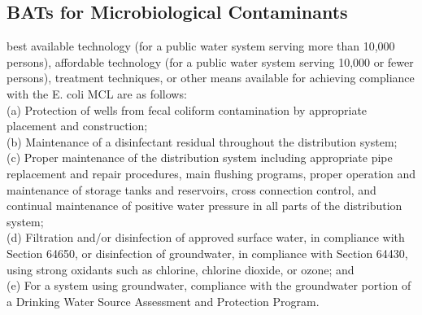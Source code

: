 \subsection{BATs for Microbiological Contaminants}  
best available technology (for a public water system serving more than 10,000 persons), affordable technology (for a public water system serving 10,000 or fewer persons), treatment techniques, or other means available for achieving compliance with the E. coli MCL are as follows:\\
(a) Protection of wells from fecal coliform contamination by appropriate placement and construction;\\
(b) Maintenance of a disinfectant residual throughout the distribution system;\\
(c) Proper maintenance of the distribution system including appropriate pipe replacement and repair procedures, main flushing programs, proper operation and maintenance of storage tanks and reservoirs, cross connection control, and continual maintenance of positive water pressure in all parts of the distribution system;\\
(d) Filtration and/or disinfection of approved surface water, in compliance with Section 64650, or disinfection of groundwater, in compliance with Section 64430, using strong oxidants such as chlorine, chlorine dioxide, or ozone; and\\
(e) For a system using groundwater, compliance with the groundwater portion of a Drinking Water Source Assessment and Protection Program.



